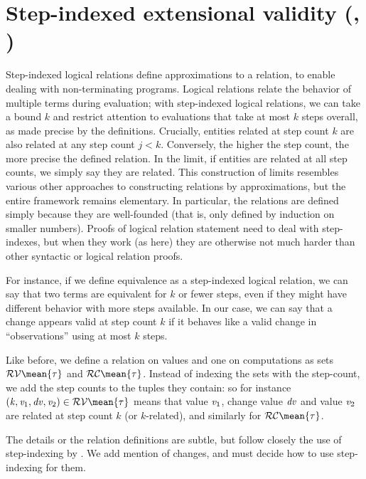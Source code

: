 \section{Step-indexed extensional validity (\ilcTau{}, \dilcTau)}
\label{sec:silr-typed-proof}
Step-indexed logical relations define approximations to a
relation, to enable dealing with non-terminating programs.
Logical relations relate the behavior of multiple terms during
evaluation; with step-indexed logical relations, we can take a
bound $k$ and restrict attention to evaluations that take at most
$k$ steps overall, as made precise by the definitions.
Crucially, entities related at step count $k$ are also
related at any step count $j < k$. Conversely, the higher the step count, the
more precise the defined relation. In the limit, if entities are related at all
step counts, we simply say they are related.
This construction of limits resembles various other approaches to constructing
relations by approximations, but the entire framework remains elementary. In
particular, the relations are defined simply because they are well-founded (that
is, only defined by induction on smaller numbers).
Proofs of logical relation statement need to deal with step-indexes, but when
they work (as here) they are otherwise not much harder than other syntactic or
logical relation proofs.

For instance, if we define equivalence as a step-indexed logical relation, we
can say that two terms are equivalent for $k$ or fewer steps, even if they might
have different behavior with more steps available. In our case, we can say that
a change appears valid at step count $k$ if it behaves like a valid change in
``observations'' using at most $k$ steps.

Like before, we define a relation on values and one on computations as sets
\ensuremath{\mathcal{RV}\mean{\tau}} and \ensuremath{\mathcal{RC}\mean{\tau}}.
Instead of indexing the sets with the step-count, we add the step counts to the
tuples they contain: so for instance \ensuremath{(\Varid{k},\Varid{v}_{1},\Varid{dv},\Varid{v}_{2})\in \mathcal{RV}\mean{\tau}} means
that value \ensuremath{\Varid{v}_{1}}, change value \ensuremath{\Varid{dv}} and value \ensuremath{\Varid{v}_{2}} are related at step count $k$
(or $k$-related), and similarly for \ensuremath{\mathcal{RC}\mean{\tau}}.

The details or the relation definitions are
subtle, but follow closely the use of step-indexing by
\citet*{Acar08}. We add mention of changes, and must decide how to use
step-indexing for them.

